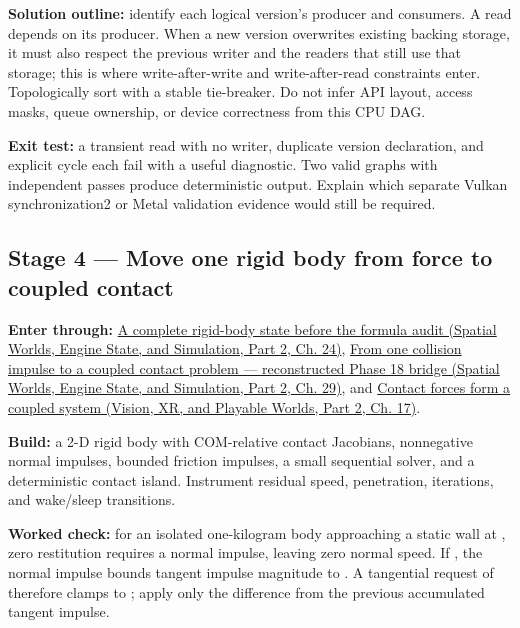 \textbf{Solution outline:} identify each logical version's producer and consumers. A read depends on its producer. When a new version overwrites existing backing storage, it must also respect the previous writer and the readers that still use that storage; this is where write-after-write and write-after-read constraints enter. Topologically sort with a stable tie-breaker. Do not infer API layout, access masks, queue ownership, or device correctness from this CPU DAG.

\textbf{Exit test:} a transient read with no writer, duplicate version declaration, and explicit cycle each fail with a useful diagnostic. Two valid graphs with independent passes produce deterministic output. Explain which separate Vulkan synchronization2 or Metal validation evidence would still be required.

\subsection{Stage 4 --- Move one rigid body from force to coupled contact}\label{06-engine-ii-ch042-stage-4-move-one-rigid-body-from-force-to-coupled-contact}

\hypertarget{06-engine-ii-ch042-stage-4-move-one-rigid-body-from-force-to-coupled-contact}{}

\textbf{Enter through:} \href{../05-Spatial-Worlds-Engine-State-and-Simulation-P02/main.pdf\#nameddest=06-engine-ii-ch035-the-complete-kairo-state-so-far}{A complete rigid-body state before the formula audit (Spatial Worlds, Engine State, and Simulation, Part 2, Ch. 24)}, \href{../05-Spatial-Worlds-Engine-State-and-Simulation-P02/main.pdf\#nameddest=06-engine-ii-ch040-from-one-collision-impulse-to-a-coupled-contact-problem-reconstructed-phase-18-bridge}{From one collision impulse to a coupled contact problem --- reconstructed Phase 18 bridge (Spatial Worlds, Engine State, and Simulation, Part 2, Ch. 29)}, and \href{../07-Vision-XR-and-Playable-Worlds-P02/main.pdf\#nameddest=06-engine-ii-ch046-contact-forces-form-a-coupled-system}{Contact forces form a coupled system (Vision, XR, and Playable Worlds, Part 2, Ch. 17)}.

\textbf{Build:} a 2-D rigid body with COM-relative contact Jacobians, nonnegative normal impulses, bounded friction impulses, a small sequential solver, and a deterministic contact island. Instrument residual speed, penetration, iterations, and wake/sleep transitions.

\textbf{Worked check:} for an isolated one-kilogram body approaching a static wall at , zero restitution requires a  normal impulse, leaving zero normal speed. If , the normal impulse bounds tangent impulse magnitude to . A tangential request of  therefore clamps to ; apply only the difference from the previous accumulated tangent impulse.

